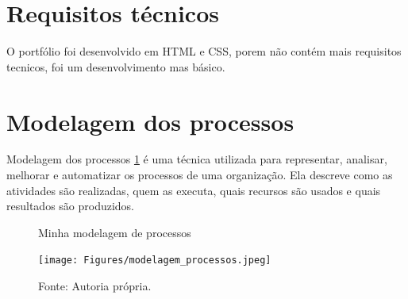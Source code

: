 \section{Requisitos técnicos}
 O portfólio foi desenvolvido em HTML e CSS, porem não contém mais requisitos tecnicos, foi um desenvolvimento mas básico.

\section{Modelagem dos processos}
 Modelagem dos processos \ref{fig:modelagem_processos} é uma técnica utilizada para representar, analisar, melhorar e automatizar os processos de uma organização. Ela descreve como as atividades são realizadas, quem as executa, quais recursos são usados e quais resultados são produzidos.
 \begin{figure} [h!]	
    \centering
    \caption{Minha modelagem de processos}
    \texttt{[image: Figures/modelagem\_processos.jpeg]}
    \caption*{Fonte: Autoria própria.}
    \label{fig:modelagem_processos}
\end{figure}